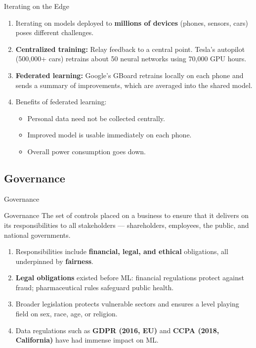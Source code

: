 \begin{frame}{Iterating on the Edge}
\begin{enumerate}
\item<1-> Iterating on models deployed to \textbf{millions of devices} (phones, sensors, cars) poses different challenges.
\item<2-> \textbf{Centralized training:} Relay feedback to a central point. Tesla's autopilot (500,000+ cars) retrains about 50 neural networks using 70,000 GPU hours.
\item<3-> \textbf{Federated learning:} Google's GBoard retrains locally on each phone and sends a summary of improvements, which are averaged into the shared model.
\item<4-> Benefits of federated learning:
    \begin{itemize}
    \item Personal data need not be collected centrally.
    \item Improved model is usable immediately on each phone.
    \item Overall power consumption goes down.
    \end{itemize}
\end{enumerate}
\end{frame}

\subsection{Governance}

\begin{frame}{Governance}
\begin{block}{Governance}
The set of controls placed on a business to ensure that it delivers on its responsibilities to all stakeholders --- shareholders, employees, the public, and national governments.
\end{block}
\vspace{0.1cm}
\begin{enumerate}
\item<1-> Responsibilities include \textbf{financial, legal, and ethical} obligations, all underpinned by \textbf{fairness}.
\item<2-> \textbf{Legal obligations} existed before ML: financial regulations protect against fraud; pharmaceutical rules safeguard public health.
\item<3-> Broader legislation protects vulnerable sectors and ensures a level playing field on sex, race, age, or religion.
\item<4-> Data regulations such as \textbf{GDPR (2016, EU)} and \textbf{CCPA (2018, California)} have had immense impact on ML.
\end{enumerate}
\end{frame}

